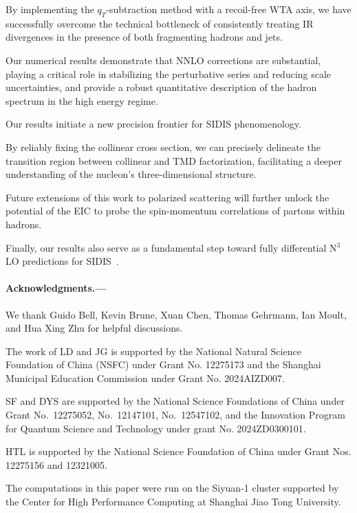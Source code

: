 \documentclass[prl,aps,twocolumn,superscriptaddress]{revtex4}
\begin{document}
By implementing the $q_T$-subtraction method with a recoil-free WTA axis, we have successfully overcome the technical bottleneck of consistently treating IR divergences in the presence of both fragmenting hadrons and jets.

Our numerical results demonstrate that NNLO corrections are substantial, playing a critical role in stabilizing the perturbative series and reducing scale uncertainties,
and provide a robust quantitative description of the hadron spectrum in the high energy regime.



Our results initiate a new precision frontier for SIDIS phenomenology.

By reliably fixing the collinear cross section, we can precisely delineate the transition region between collinear and TMD factorization, facilitating a deeper understanding of the nucleon's three-dimensional structure.

Future extensions of this work to polarized scattering will further unlock the potential of the EIC to probe the spin-momentum correlations of partons within hadrons.

Finally, our results also serve as a fundamental step toward fully differential N$^3$LO predictions for SIDIS~\cite{Gao:2026tnd}.





\paragraph*{Acknowledgments.---}

We thank Guido Bell, Kevin Brune, Xuan Chen, Thomas Gehrmann, Ian Moult, and Hua Xing Zhu for helpful discussions.

The work of LD and JG is supported by the National Natural Science Foundation of China (NSFC) under Grant No. 12275173 and the Shanghai Municipal Education Commission under Grant No. 2024AIZD007.

SF and DYS are supported by the National Science Foundations of China under Grant No.~12275052, No.~12147101, No.~12547102, and the Innovation Program for Quantum Science and Technology under grant No. 2024ZD0300101.

HTL is supported by the National Science Foundation of China under Grant Nos. 12275156 and 12321005.

The computations in this paper were run on the Siyuan-1 cluster supported by the Center for High Performance Computing at Shanghai Jiao Tong University.




\end{document}
